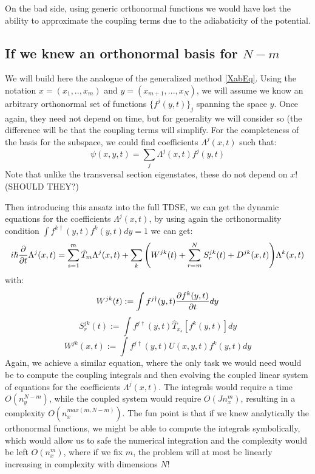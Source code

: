 \documentclass[11pt, a4paper]{article} %
\begin{document}
On the bad side, using generic orthonormal functions we would have lost the ability to approximate the coupling terms due to the adiabaticity of the potential.

\subsection{If we knew an orthonormal basis for $N-m$}
We will build here the analogue of the generalized method \eqref{XabEq}. Using the notation $x=(x_1,..,x_m)$ and $y=(x_{m+1},...,x_N)$, we will assume we know an arbitrary orthonormal set of functions $\{ f^j(y,t) \}_j$ spanning the space $y$. Once again, they need not depend on time, but for generality we will consider so (the difference will be that the coupling terms will simplify. For the completeness of the basis for the subspace, we could find coefficients $\Lambda^j(x,t)$ such that:
\begin{equation}
\psi(x,y,t)=\sum_j \Lambda^j(x,t) f^j(y,t)
\end{equation}
Note that unlike the transversal section eigenstates, these do not depend on $x$! (SHOULD THEY?)

Then introducing this ansatz into the full TDSE, we can get the dynamic equations for the coefficients $\Lambda^j(x,t)$, by using again the orthonormality condition $\int f^{k\dagger}(y,t)f^k(y,t)dy=1$ we can get:
\begin{equation}
i\hbar \pdv{}{t}\Lambda^j(x,t)= \sum_{s=1}^m \hat{T}_m \Lambda^j(x,t) + \sum_k \qty( W^{jk}(t)+\sum_{r=m}^NS^{jk}_r(t)+D^{jk}(x,t) )\Lambda^k(x,t)
\end{equation}
with:
\begin{equation}
W^{jk}(t):=\int f^{j\dagger}(y,t) \pdv{f^k(y,t)}{t} dy
\end{equation}
\begin{equation}
S^{jk}_r(t):=\int f^{j\dagger}(y,t) \hat{T}_{x_s}[f^k(y,t)] dy
\end{equation}
\begin{equation}
W^{jk}(x,t):=\int f^{j\dagger}(y,t)U(x,y,t) f^k(y,t) dy
\end{equation}
Again, we achieve a similar equation, where the only task we would need would be to compute the coupling integrals and then evolving the coupled linear system of equations for the coefficients $\Lambda^j(x,t)$. The integrals would require a time $O(n_y^{N-m})$, while the coupled system would require $O(Jn_x^m)$, resulting in a complexity $O(n_x^{max(m, N-m)})$. The fun point is that if we knew analytically the orthonormal functions, we might be able to compute the integrals symbolically, which would allow us to safe the numerical integration and the complexity would be left $O(n_x^m)$, where if we fix $m$, the problem will at most be linearly increasing in complexity with dimensions $N$!
\end{document}
